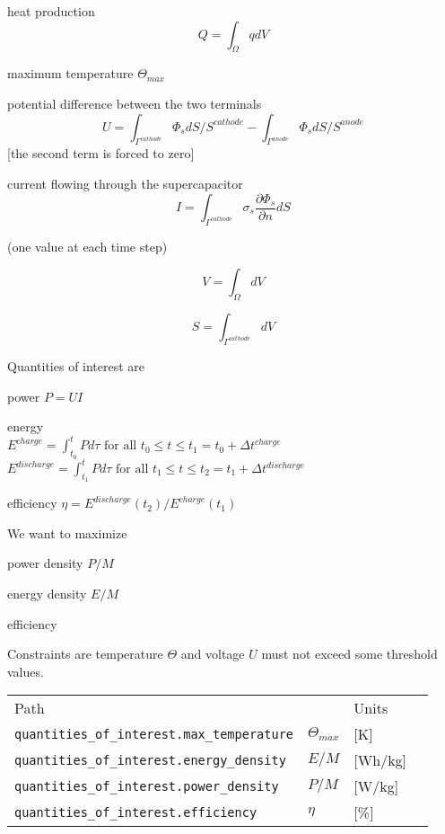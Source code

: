 \documentclass[10pt, oneside]{article}   	%
\begin{document}
heat production
\begin{equation}
Q = \int_\Omega q dV
\end{equation}

maximum temperature $\Theta_{max}$

potential difference between the two terminals
\begin{equation}
U = \int_{\Gamma^{cathode}} \Phi_s dS / S^{cathode} 
- \int_{\Gamma^{anode}} \Phi_s dS / S^{anode}
\end{equation}
[the second term is forced to zero]

current flowing through the supercapacitor
\begin{equation}
I = \int_{\Gamma^{cathode}} \sigma_s \frac{\partial \Phi_s}{\partial n} dS
\end{equation}

(one value at each time step)

\begin{equation}
V = \int_\Omega dV
\end{equation}

\begin{equation}
S = \int_{\Gamma^{cathode}} dV
\end{equation}

Quantities of interest are 

power $P=UI$

energy \\
$E^{charge}   =\int_{t_0}^{t} P d\tau \text{\ for\ all\ } t_0 \leq t \leq t_1=t_0+\Delta t^{charge}   $
\\
$E^{discharge}=\int_{t_1}^{t} P d\tau \text{\ for\ all\ } t_1 \leq t \leq t_2=t_1+\Delta t^{discharge}$

efficiency $\eta=E^{discharge}(t_2)/E^{charge}(t_1)$

We want to maximize 

power density $P/M$

energy density $E/M$

efficiency

Constraints are 
temperature $\Theta$ and voltage $U$ must not exceed some threshold values.

{\footnotesize
\begin{tabular}{llll}
Path                      &     & Units \\
\texttt{quantities\_of\_interest.max\_temperature} & $\Theta_{max}$ & [K] \\
\texttt{quantities\_of\_interest.energy\_density}  & $E/M$          & [Wh/kg] \\
\texttt{quantities\_of\_interest.power\_density}   & $P/M$          & [W/kg] \\
\texttt{quantities\_of\_interest.efficiency}       & $\eta$         & [\%] \\
\end{tabular}
}
\end{document}
